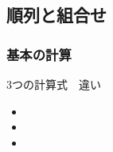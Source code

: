 \documentclass[10pt,dvipdfmx]{jsarticle}
\begin{document}
\subsection*{順列と組合せ}
\subsubsection*{基本の計算}
\begin{itembox}[l]{3つの計算式　違い}
  \begin{multicols}{3}
    \begin{itemize}
      \item \item \item
    \end{itemize}
  \end{multicols}
\end{itembox}
\end{document}
